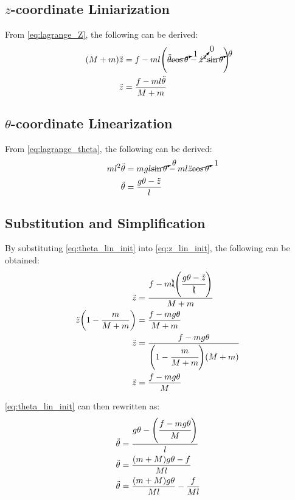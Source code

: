 \documentclass[]{article}
\begin{document}
	\subsection{$z$-coordinate Liniarization}
		From \eqref{eq:lagrange_Z}, the following can be derived:
		\begin{align}
			(M+m)\ddot{z} &= f -ml \qty(\ddot{\theta}\cancelto{1}{\cos{\theta}} - \cancelto{0}{\dot{z}^2}\cancelto{\theta}{\sin{\theta}} ) \nonumber\\
			\ddot{z} &= \frac{f -ml \ddot{\theta}}{M+m} \label{eq:z_lin_init}
		\end{align}
	
	\subsection{$\theta$-coordinate Linearization}
		From \eqref{eq:lagrange_theta}, the following can be derived:
		\begin{align}
			m l^2 \ddot{\theta} &= m g l \cancelto{\theta}{\sin{\theta}} - m l \ddot{z} \cancelto{1}{\cos{\theta}} \nonumber\\
			\ddot{\theta} &= \frac{g\theta -\ddot{z}}{l} \label{eq:theta_lin_init}
		\end{align}
		
	\subsection{Substitution and Simplification}
		By substituting \eqref{eq:theta_lin_init} into \eqref{eq:z_lin_init}, the following can be obtained:
		\begin{align}
			\ddot{z} &= \frac{f -m\bcancel{l} \qty(\cfrac{g\theta-\ddot{z}}{\bcancel{l}})}{M+m} \nonumber\\
			\ddot{z} \qty(1-\frac{m}{M+m}) &= \frac{f - mg\theta}{M+m} \nonumber\\
			\ddot{z} &= \frac{f-mg\theta}{\qty(1-\cfrac{m}{M+m}) \qty(M+m)} \nonumber\\
			\ddot{z} &= \frac{f-mg\theta}{M} \label{eq:z_lin}
		\end{align}
		
		\eqref{eq:theta_lin_init} can then rewritten as:
		\begin{align}
			\ddot{\theta} &= \frac{g\theta -\qty(\cfrac{f-mg\theta}{M})}{l} \nonumber\\
			\ddot{\theta} &= \frac{(m+M)g\theta - f}{Ml} \nonumber\\
			\ddot{\theta} &= \frac{(m+M)g\theta}{Ml} - \frac{f}{Ml} \label{eq:theta_lin}
		\end{align}
\end{document}
